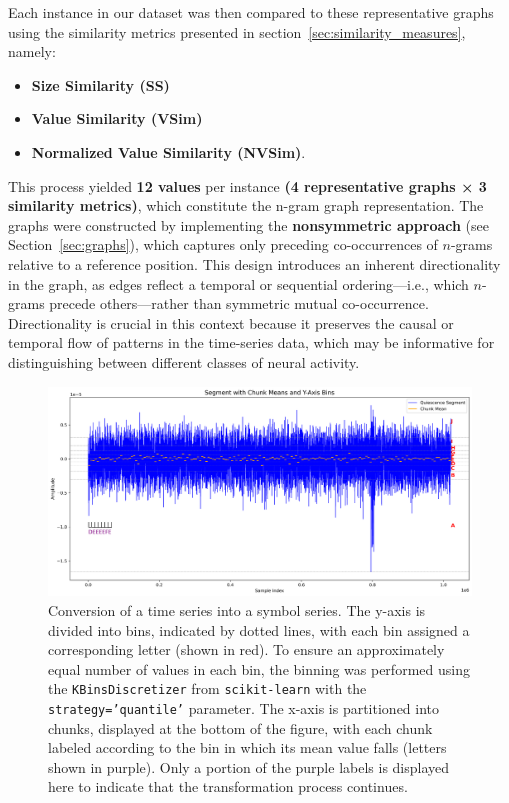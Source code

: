 \documentclass{article}
\begin{document}
Each instance in our dataset was then compared to these representative graphs using the similarity metrics presented in section~\ref{sec:similarity_measures}, namely:
\begin{itemize}
    \item \textbf{Size Similarity (SS)}
    \item \textbf{Value Similarity (VSim)}
    \item \textbf{Normalized Value Similarity (NVSim)}. 
\end{itemize}    
This process yielded \textbf{12 values} per instance \textbf{(4 representative graphs × 3 similarity metrics)}, which constitute the n-gram graph representation. The graphs were constructed by implementing the \textbf{nonsymmetric approach} (see Section~\ref{sec:graphs}), which captures only preceding co-occurrences of $n$-grams relative to a reference position. This design introduces an inherent directionality in the graph, as edges reflect a temporal or sequential ordering—i.e., which $n$-grams precede others—rather than symmetric mutual co-occurrence. Directionality is crucial in this context because it preserves the causal or temporal flow of patterns in the time-series data, which may be informative for distinguishing between different classes of neural activity.

\begin{figure}[htbp]
    \centering
    \includegraphics[width=\linewidth]{graph_binning_with_chunks_high_res1_ready.png}
    \caption[Time series conversion to symbol series]{Conversion of a time series into a symbol series. The y-axis is divided into bins, indicated by dotted lines, with each bin assigned a corresponding letter (shown in red). To ensure an approximately equal number of values in each bin, the binning was performed using the \texttt{KBinsDiscretizer} from \texttt{scikit-learn} with the \texttt{strategy='quantile'} parameter. The x-axis is partitioned into chunks, displayed at the bottom of the figure, with each chunk labeled according to the bin in which its mean value falls (letters shown in purple). Only a portion of the purple labels is displayed here to indicate that the transformation process continues.}
    \label{fig:binning}
\end{figure}
\end{document}
